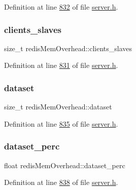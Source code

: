 Definition at line \hyperlink{server_8h_source_l00832}{832} of file \hyperlink{server_8h_source}{server.\+h}.

\mbox{\label{structredisMemOverhead_af6e5d3af15ba387b629ec39c3efb0551}} 
\subsubsection{\texorpdfstring{clients\+\_\+slaves}{clients\_slaves}}
{\footnotesize\ttfamily size\+\_\+t redis\+Mem\+Overhead\+::clients\+\_\+slaves}



Definition at line \hyperlink{server_8h_source_l00831}{831} of file \hyperlink{server_8h_source}{server.\+h}.

\mbox{\label{structredisMemOverhead_aa136ef141fcbe58f2313e3e30d8c4d06}} 
\subsubsection{\texorpdfstring{dataset}{dataset}}
{\footnotesize\ttfamily size\+\_\+t redis\+Mem\+Overhead\+::dataset}



Definition at line \hyperlink{server_8h_source_l00835}{835} of file \hyperlink{server_8h_source}{server.\+h}.

\mbox{\label{structredisMemOverhead_ad2a3a533d86ff19c4f5de4c63a84f4a5}} 
\subsubsection{\texorpdfstring{dataset\+\_\+perc}{dataset\_perc}}
{\footnotesize\ttfamily float redis\+Mem\+Overhead\+::dataset\+\_\+perc}



Definition at line \hyperlink{server_8h_source_l00838}{838} of file \hyperlink{server_8h_source}{server.\+h}.

